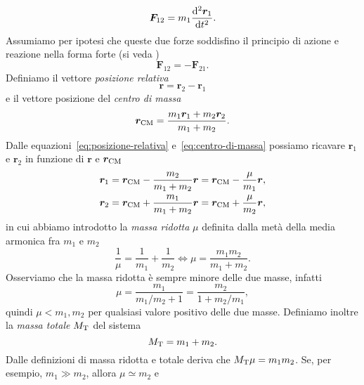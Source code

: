 \begin{equation}
  \label{eq:f12}
  \bm{F}_{12} = m_1\toder[2]{\bm{r}_1}{t}.
\end{equation}
Assumiamo per ipotesi che queste due forze soddisfino il principio di azione e
reazione nella forma forte (si veda \textcite{goldstein:meccanica})
\begin{equation}
  \label{eq:azione-reazione}
  \bm{F}_{12} = -\bm{F}_{21}.
\end{equation}
Definiamo il vettore \emph{posizione relativa}
\begin{equation}
  \label{eq:posizione-relativa}
  \bm{r}=\bm{r}_2-\bm{r}_1
\end{equation}
e il vettore posizione del \emph{centro di massa}
\begin{equation}
  \label{eq:centro-di-massa}
  \bm{r}_\textup{CM} = \frac{m_1\bm{r}_1+m_2\bm{r}_2}{m_1+m_2}.
\end{equation}
Dalle equazioni~\eqref{eq:posizione-relativa} e~\eqref{eq:centro-di-massa}
possiamo ricavare $\bm{r}_1$ e $\bm{r}_2$ in funzione di $\bm{r}$ e
$\bm{r}_\textup{CM}$
\begin{subequations}
  \label{eq:r1-r2-posizione-relativa-cdm}
  \begin{align}
    \bm{r}_1 &= \bm{r}_\textup{CM} - \frac{m_2}{m_1+m_2}\bm{r} =
    \bm{r}_\textup{CM} - \frac{\mu}{m_1}\bm{r},\\
    \bm{r}_2 &= \bm{r}_\textup{CM} + \frac{m_1}{m_1+m_2}\bm{r} =
    \bm{r}_\textup{CM} + \frac{\mu}{m_2}\bm{r},
  \end{align}
\end{subequations}
in cui abbiamo introdotto la \emph{massa ridotta} $\mu$ definita dalla metà
della media armonica fra $m_1$ e $m_2$
\begin{equation}
  \frac{1}{\mu} = \frac{1}{m_1} + \frac{1}{m_2} \iff \mu=\frac{m_1m_2}{m_1+m_2}.
\end{equation}
Osserviamo che la massa ridotta è sempre minore delle due masse, infatti
\begin{equation}
  \mu =\frac{m_1}{m_1/m_2+1} = \frac{m_2}{1+m_2/m_1},
\end{equation}
quindi $\mu < m_1,m_2$ per qualsiasi valore positivo delle due masse. Definiamo
inoltre la \emph{massa totale} $M_\textup{T}$ del sistema
\begin{equation}
  M_\textup{T}=m_1+m_2.
\end{equation}
Dalle definizioni di massa ridotta e totale deriva che
$M_\textup{T}\mu=m_1m_2$. Se, per esempio, $m_1\gg m_2$, allora $\mu\simeq m_2$ e
